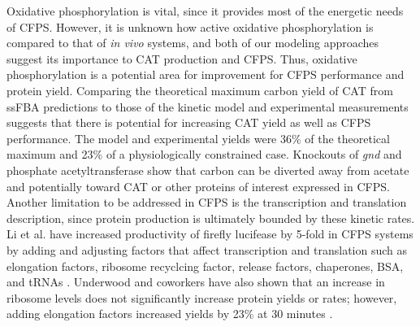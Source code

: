 \documentclass[12pt]{article}
\begin{document}
Oxidative phosphorylation is vital, since it provides most of the energetic needs of CFPS.
However, it is unknown how active oxidative phosphorylation is compared to that of \textit{in vivo} systems, and both of our modeling approaches suggest its importance to CAT production and CFPS.
Thus, oxidative phosphorylation is a potential area for improvement for CFPS performance and protein yield.
Comparing the theoretical maximum carbon yield of CAT from ssFBA predictions to those of the kinetic model and experimental measurements suggests that there is potential for increasing CAT yield as well as CFPS performance.
The model and experimental yields were 36\% of the theoretical maximum and 23\% of a physiologically constrained case.
Knockouts of \textit{gnd} and phosphate acetyltransferase show that carbon can be diverted away from acetate and potentially toward CAT or other proteins of interest expressed in CFPS.
Another limitation to be addressed in CFPS is the transcription and translation description, since protein production is ultimately bounded by these kinetic rates.
Li et al. have increased productivity of firefly lucifease by 5-fold in CFPS systems by adding and adjusting factors that affect transcription and translation such as elongation factors, ribosome recyclcing factor, release factors, chaperones, BSA, and tRNAs \cite{2014_li_PlosOne}.
Underwood and coworkers have also shown that an increase in ribosome levels does not significantly increase protein yields or rates; however, adding elongation factors increased yields by 23\% at 30 minutes \cite{2005_underwood_biotech}.
\end{document}

